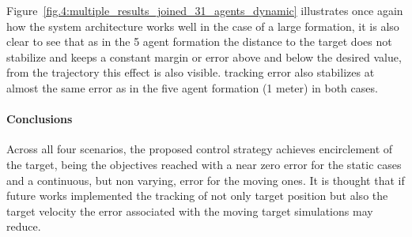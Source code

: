 Figure~\ref{fig.4:multiple_results_joined_31_agents_dynamic} illustrates once again how the system architecture works well in the case of a large formation, it is also clear to see that as in the 5 agent formation the distance to the target does not stabilize and keeps a constant margin or error above and below the desired value, from the trajectory this effect is also visible. tracking error also stabilizes at almost the same error as in the five agent formation (1 meter) in both cases.

\paragraph{Conclusions} Across all four scenarios, the proposed control strategy achieves encirclement of the target, being the objectives reached with a near zero error for the static cases and a continuous, but non varying, error for the moving ones. It is thought that if future works implemented the tracking of not only target position but also the target velocity the error associated with the moving target simulations may reduce.
